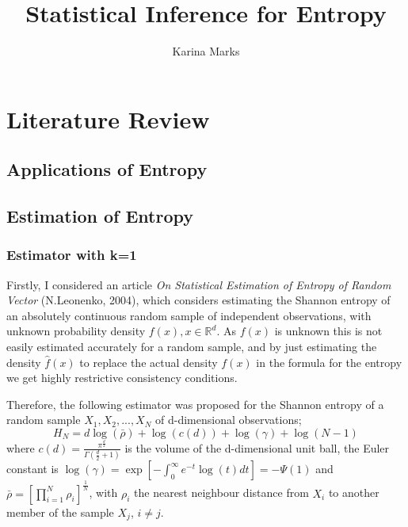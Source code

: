 \documentclass{article}
\title{Statistical Inference for Entropy}
\author{Karina Marks}
\begin{document}
\section{Literature Review}

\subsection{Applications of Entropy}

\subsection{Estimation of Entropy}

\subsubsection{Estimator with k=1}

Firstly, I considered an article \textit{On Statistical Estimation of Entropy of Random Vector} (N.Leonenko, 2004), which considers estimating the Shannon entropy of an absolutely continuous random sample of independent observations, with unknown probability density $f(x), x \in \mathbb{R}^{d}$. As $f(x)$ is unknown this is not easily estimated accurately for a random sample, and by just estimating the density $\hat{f}(x)$ to replace the actual density $f(x)$ in the formula for the entropy we get highly restrictive consistency conditions. 

Therefore, the following estimator was proposed for the Shannon entropy of a random sample $X_{1}, X_{2}, ..., X_{N}$ of d-dimensional observations;
\begin{equation}
H_{N} = d \log(\bar{\rho } ) + \log (c(d)) + \log (\gamma) + \log (N-1)
\end{equation}
where $c(d) = \frac{\pi^{\frac{d}{2}}}{\Gamma ( \frac{d}{2} + 1 )}$ is the volume of the d-dimensional unit ball, the Euler constant is $\log (\gamma) = \exp \left[ - \int_{0}^{\infty} e^{-t} \log(t) dt \right] = -\Psi(1)$ and $\bar{\rho} = \left[ \prod_{i=1}^{N} \rho_{i} \right]^{\frac{1}{N}}$, with $\rho_{i}$ the nearest neighbour distance from $X_{i}$ to another member of the sample $X_{j}$, $i \neq j$. 
\end{document}

